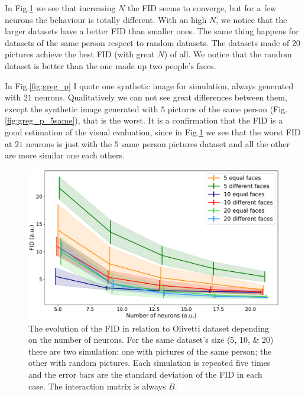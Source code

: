 \documentclass[a4paper,12pt]{article}
\begin{document}
In Fig.\ref{fig:greg_g} we see that increasing $N$ the FID seems to converge, but for a few neurons the behaviour is totally different.
With an high $N$, we notice that the larger datasets have a better FID than smaller ones.
The same thing happens for datasets of the same person respect to random datasets.
The datasets made of $20$ pictures achieve the best FID (with great $N$) of all.
We notice that the random dataset is better than the one made up two people's faces.

In Fig.\ref{fig:greg_p} I quote one synthetic image for simulation, always generated with $21$ neurons.
Qualitatively we can not see great differences between them, except the synthetic image generated with $5$ pictures of the same person (Fig.\ref{fig:greg_p_5same}), that is the worst.
It is a confirmation that the FID is a good estimation of the visual evaluation, since in Fig.\ref{fig:greg_g} we see that the worst FID at $21$ neurons is just with the $5$ same person pictures dataset and all the other are more similar one each others.

\begin{figure}[!htbp]
  \centering
  \includegraphics[width=.9\columnwidth]{greg.pdf}
  \caption[FID changing dataset's size]{The evolution of the FID in relation to Olivetti dataset depending on the number of neurons.
  For the same dataset's size (\numlist{5;10;20}) there are two simulation: one with pictures of the same person; the other with random pictures.
  Each simulation is repeated five times and the error bars are the standard deviation of the FID in each case.
  The interaction matrix is always $B$.
  }
  \label{fig:greg_g}
\end{figure}
\end{document}
